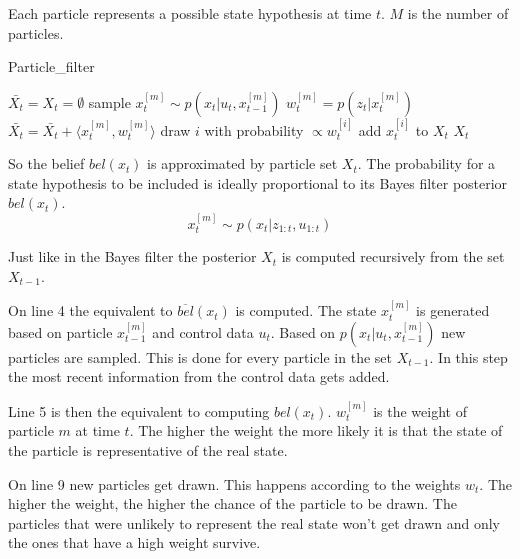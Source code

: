 Each particle represents a possible state hypothesis at time $t$. $M$ is the number of particles. \cite[p. 96-97]{Thrun:2005:PR:1121596}

\begin{algorithm}
\caption{Particle\_filter \cite[p. 98]{Thrun:2005:PR:1121596}}
\label{particle_filter}
\begin{algorithmic}[1]
\State $\bar{X_t} = X_t = \emptyset$
\State sample $x_t^{[m]} \sim p(x_t|u_t,x_{t-1}^{[m]})$
\State $w_t^{[m]} = p(z_t|x_t^{[m]})$
\State $\bar{X_t} = \bar{X_t} + \langle x_t^{[m]},w_t^{[m]}\rangle$
\EndFor
{}
\State draw $i$ with probability $\propto w_t^{[i]}$
\State add $x_t^{[i]}$ to $X_t$
\EndFor
\State \Return $X_t$
\EndProcedure
\end{algorithmic}
\end{algorithm}

So the belief $bel(x_t)$ is approximated by particle set $X_t$. The probability for a state hypothesis to be included is ideally proportional to its Bayes filter posterior $bel(x_t)$. \cite[p. 98]{Thrun:2005:PR:1121596}
\begin{equation} \label{eq:particle_prob}
x_t^{[m]} \sim p(x_t|z_{1:t},u_{1:t})
\end{equation}

Just like in the Bayes filter the posterior $X_t$ is computed recursively from the set $X_{t-1}$. 

On line 4 the equivalent to $\overline{bel}(x_t)$ is computed. The state $x_t^{[m]}$ is generated based on particle $x_{t-1}^{[m]}$ and control data $u_t$. Based on $p(x_t|u_t,x_{t-1}^{[m]})$ new particles are sampled. This is done for every particle in the set $X_{t-1}$. In this step the most recent information from the control data gets added.

Line 5 is then the equivalent to computing $bel(x_t)$. $w_t^{[m]}$ is the weight of particle $m$ at time $t$. The higher the weight the more likely it is that the state of the particle is representative of the real state. 

On line 9 new particles get drawn. This happens according to the weights $w_t$. The higher the weight, the higher the chance of the particle to be drawn. The particles that were unlikely to represent the real state won't get drawn and only the ones that have a high weight survive.





